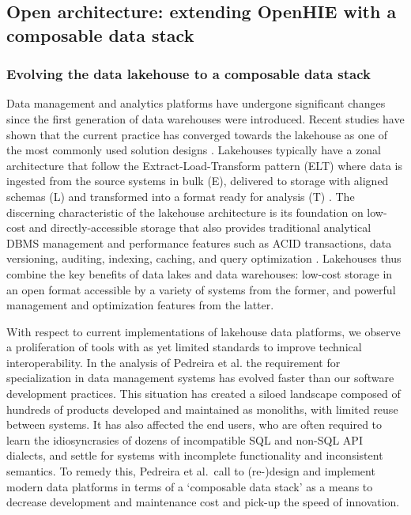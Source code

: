 \documentclass[
  authoryear]{elsarticle}
\begin{document}
\subsection{Open architecture: extending OpenHIE with a composable data
stack}\label{open-architecture-extending-openhie-with-a-composable-data-stack}

\subsubsection{Evolving the data lakehouse to a composable data
stack}\label{evolving-the-data-lakehouse-to-a-composable-data-stack}

Data management and analytics platforms have undergone significant
changes since the first generation of data warehouses were introduced.
Recent studies have shown that the current practice has converged
towards the lakehouse as one of the most commonly used solution designs
\citep{armbrust2021lakehouse, hai2023data, harby2022data}. Lakehouses
typically have a zonal architecture that follow the
Extract-Load-Transform pattern (ELT) where data is ingested from the
source systems in bulk (E), delivered to storage with aligned schemas
(L) and transformed into a format ready for analysis (T)
\citep{hai2023data}. The discerning characteristic of the lakehouse
architecture is its foundation on low-cost and directly-accessible
storage that also provides traditional analytical DBMS management and
performance features such as ACID transactions, data versioning,
auditing, indexing, caching, and query optimization
\citep{armbrust2021lakehouse}. Lakehouses thus combine the key benefits
of data lakes and data warehouses: low-cost storage in an open format
accessible by a variety of systems from the former, and powerful
management and optimization features from the latter.

With respect to current implementations of lakehouse data platforms, we
observe a proliferation of tools with as yet limited standards to
improve technical interoperability. In the analysis of Pedreira et al.
\citep{pedreira2023composable} the requirement for specialization in
data management systems has evolved faster than our software development
practices. This situation has created a siloed landscape composed of
hundreds of products developed and maintained as monoliths, with limited
reuse between systems. It has also affected the end users, who are often
required to learn the idiosyncrasies of dozens of incompatible SQL and
non-SQL API dialects, and settle for systems with incomplete
functionality and inconsistent semantics. To remedy this, Pedreira et
al.~call to (re-)design and implement modern data platforms in terms of
a `composable data stack' as a means to decrease development and
maintenance cost and pick-up the speed of innovation.
\end{document}
